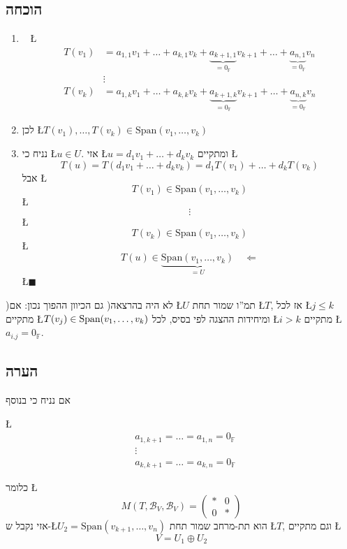 \documentclass[english,hebrew]{article}
\begin{document}
\subsection{הוכחה}
\begin{enumerate}
\item ~ \L{%
\begin{align*}
T(v_{1}) & =a_{1,1}v_{1}+\dots+a_{k,1}v_{k}+\underset{=0_{\mathbb{F}}}{\underbrace{a_{k+1,1}}}v_{k+1}+\dots+\underset{=0_{\mathbb{F}}}{\underbrace{a_{n,1}}}v_{n}\\
 & \vdots\\
T(v_{k}) & =a_{1,k}v_{1}+\dots+a_{k,k}v_{k}+\underset{=0_{\mathbb{F}}}{\underbrace{a_{k+1,k}}}v_{k+1}+\dots+\underset{=0_{\mathbb{F}}}{\underbrace{a_{n,k}}}v_{n}
\end{align*}
}%
\item לכן \L{$T(v_{1}),\dots,T(v_{k})\in\text{Span}(v_{1},\dots,v_{k})$}
\item נניח כי \L{$u\in U$}. אזי \L{$u=d_{1}v_{1}+\dots+d_{k}v_{k}$} ומתקיים
\L{%
\[
T(u)=T(d_{1}v_{1}+\dots+d_{k}v_{k})=d_{1}T(v_{1})+\dots+d_{k}T(v_{k})
\]
}%
אבל \L{%
\[
T(v_{1})\in\text{Span}(v_{1},\dots,v_{k})
\]
}%
\L{%
\[
\vdots
\]
}%
\L{%
\[
T(v_{k})\in\text{Span}(v_{1},\dots,v_{k})
\]
}%
\L{%
\[
T(u)\in\underset{=U}{\underbrace{\text{Span}(v_{1},\dots,v_{k})}}\quad\Leftarrow
\]
}%
\hfill{}\L{$\blacksquare$}
\end{enumerate}
)לא היה בהרצאה( גם הכיוון ההפוך נכון: אם \L{$U$} תמ\textquotedblright ו
שמור תחת \L{$T$}, אז לכל \L{$j\le k$} מתקיים \L{$T(v_{j})\in\text{Span\ensuremath{\left(v_{1},\dots,v_{k}\right)}}$}
ומיחידות ההצגה לפי בסיס, לכל \L{$i>k$} מתקיים \L{$a_{i.j}=0_{\mathbb{F}}$}.

\subsection{הערה}

אם נניח כי בנוסף 

\L{%
\begin{align*}
 & a_{1,k+1}=\dots=a_{1,n}=0_{\mathbb{F}}\\
 & \vdots\\
 & a_{k,k+1}=\dots=a_{k,n}=0_{\mathbb{F}}
\end{align*}
}%

כלומר \L{%
\[
M(T,\mathcal{B}_{V},\mathcal{B}_{V})=\left(\begin{array}{c|c}
* & 0\\
\hline 0 & *
\end{array}\right)
\]
}%
אזי נקבל ש-\L{$U_{2}=\text{Span}(v_{k+1},\dots,v_{n})$} הוא תת-מרחב
שמור תחת \L{$T$}, וגם מתקיים \L{%
\[
V=U_{1}\oplus U_{2}
\]
}%
\end{document}
